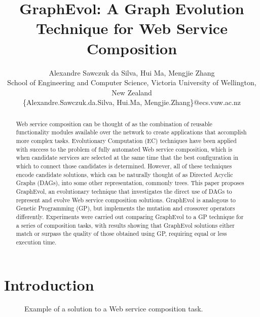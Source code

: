 \documentclass{article}
\title{GraphEvol: A Graph Evolution Technique for Web Service Composition}
\author{Alexandre Sawczuk da Silva, Hui Ma, Mengjie Zhang\\ School of
Engineering and Computer Science, Victoria University of Wellington, New Zealand\\
\{Alexandre.Sawczuk.da.Silva, Hui.Ma, Mengjie.Zhang\}@ecs.vuw.ac.nz}
\begin{document}
\maketitle

\begin{abstract}
  Web service composition can be thought of as the combination of reusable functionality modules available over the network to
  create applications that accomplish more complex tasks. Evolutionary Computation (EC) techniques have been applied with success
  to the problem of fully automated Web service composition, which is when candidate services are selected at the same time that the best configuration in which to connect those candidates is determined. However, all of
  these techniques encode candidate solutions, which can be naturally thought of as Directed Acyclic Graphs (DAGs), into some  
  other representation, commonly trees. This paper proposes GraphEvol, an evolutionary technique that investigates the direct use
  of DAGs to represent and evolve Web service composition solutions. GraphEvol is analogous to Genetic Programming (GP), but 
  implements the mutation and crossover operators differently. Experiments were carried out comparing GraphEvol to a GP technique
  for a series of composition tasks, with results showing that GraphEvol solutions either match or surpass the quality of those 
  obtained using GP, requiring equal or less execution time.
\end{abstract}

\section{Introduction}

\begin{figure}
\centerline{
}
\caption{Example of a solution to a Web service composition task.}
\label{fig:compositionExample}
\end{figure}
\end{document}

